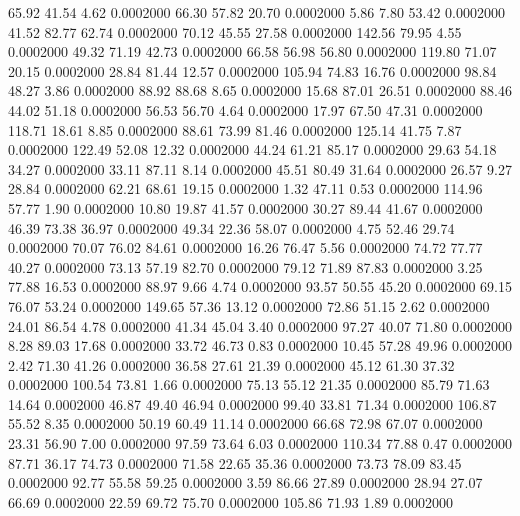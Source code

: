   65.92   41.54    4.62   0.0002000
  66.30   57.82   20.70   0.0002000
   5.86    7.80   53.42   0.0002000
  41.52   82.77   62.74   0.0002000
  70.12   45.55   27.58   0.0002000
 142.56   79.95    4.55   0.0002000
  49.32   71.19   42.73   0.0002000
  66.58   56.98   56.80   0.0002000
 119.80   71.07   20.15   0.0002000
  28.84   81.44   12.57   0.0002000
 105.94   74.83   16.76   0.0002000
  98.84   48.27    3.86   0.0002000
  88.92   88.68    8.65   0.0002000
  15.68   87.01   26.51   0.0002000
  88.46   44.02   51.18   0.0002000
  56.53   56.70    4.64   0.0002000
  17.97   67.50   47.31   0.0002000
 118.71   18.61    8.85   0.0002000
  88.61   73.99   81.46   0.0002000
 125.14   41.75    7.87   0.0002000
 122.49   52.08   12.32   0.0002000
  44.24   61.21   85.17   0.0002000
  29.63   54.18   34.27   0.0002000
  33.11   87.11    8.14   0.0002000
  45.51   80.49   31.64   0.0002000
  26.57    9.27   28.84   0.0002000
  62.21   68.61   19.15   0.0002000
   1.32   47.11    0.53   0.0002000
 114.96   57.77    1.90   0.0002000
  10.80   19.87   41.57   0.0002000
  30.27   89.44   41.67   0.0002000
  46.39   73.38   36.97   0.0002000
  49.34   22.36   58.07   0.0002000
   4.75   52.46   29.74   0.0002000
  70.07   76.02   84.61   0.0002000
  16.26   76.47    5.56   0.0002000
  74.72   77.77   40.27   0.0002000
  73.13   57.19   82.70   0.0002000
  79.12   71.89   87.83   0.0002000
   3.25   77.88   16.53   0.0002000
  88.97    9.66    4.74   0.0002000
  93.57   50.55   45.20   0.0002000
  69.15   76.07   53.24   0.0002000
 149.65   57.36   13.12   0.0002000
  72.86   51.15    2.62   0.0002000
  24.01   86.54    4.78   0.0002000
  41.34   45.04    3.40   0.0002000
  97.27   40.07   71.80   0.0002000
   8.28   89.03   17.68   0.0002000
  33.72   46.73    0.83   0.0002000
  10.45   57.28   49.96   0.0002000
   2.42   71.30   41.26   0.0002000
  36.58   27.61   21.39   0.0002000
  45.12   61.30   37.32   0.0002000
 100.54   73.81    1.66   0.0002000
  75.13   55.12   21.35   0.0002000
  85.79   71.63   14.64   0.0002000
  46.87   49.40   46.94   0.0002000
  99.40   33.81   71.34   0.0002000
 106.87   55.52    8.35   0.0002000
  50.19   60.49   11.14   0.0002000
  66.68   72.98   67.07   0.0002000
  23.31   56.90    7.00   0.0002000
  97.59   73.64    6.03   0.0002000
 110.34   77.88    0.47   0.0002000
  87.71   36.17   74.73   0.0002000
  71.58   22.65   35.36   0.0002000
  73.73   78.09   83.45   0.0002000
  92.77   55.58   59.25   0.0002000
   3.59   86.66   27.89   0.0002000
  28.94   27.07   66.69   0.0002000
  22.59   69.72   75.70   0.0002000
 105.86   71.93    1.89   0.0002000
